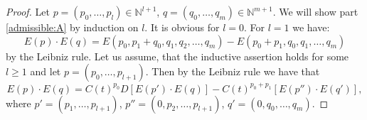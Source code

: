 \documentclass[12pt]{amsart}
\theoremstyle{plain}
\theoremstyle{remark}
\newcommand{\N}{\mathbb{N}}
\begin{document}
\begin{proof}
Let $p = (p_0,\dots,p_l) \in \N^{l+1}$, $q = (q_0,\dots,q_m) \in \N^{m+1}$.
We will show part \ref{admissible:A} by induction on $l$. It is obvious for
$l = 0$. For $l = 1$
we have:
$$E(p)\cdot E(q) = E(p_0,p_1 + q_0, q_1,q_2,\dots,q_m) -
E(p_0+p_1,q_0,q_1,\dots,q_m)$$
% 
by the Leibniz rule.
Let us
assume, that the inductive assertion holds for some $l \geq 1$ and let $p =
(p_0, \dots,p_{l+1})$. Then by the
Leibniz rule we have that
\begin{equation}
\label{leibnizA}
E(p)\cdot E(q) = C(t)^{p_0}D \left[ E(p')\cdot E(q)\right] -
C(t)^{p_0+p_1}\left[ E(p'')\cdot E(q')\right],
\end{equation}
where $p' = (p_1,\dots,p_{l+1})$, $p'' = (0,p_2,\dots,p_{l+1})$, $q' =
(0,q_0,\dots,q_m)$.

\end{proof}
\end{document}
